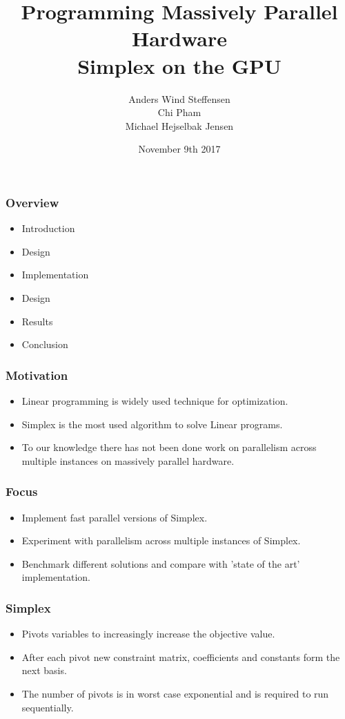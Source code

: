\documentclass{beamer}
\title{Programming Massively Parallel Hardware\\\textbf{Simplex on the GPU}}
\author[]{%
  Anders Wind Steffensen \\
  Chi Pham \\
  Michael Hejselbak Jensen \\
}
\institute{Department of Computer Science (DIKU)\\University of Copenhagen}
\date[3/3]{November 9th 2017}
\begin{document}
\titleslide


\begin{frame}
  \frametitle{Overview}
  \begin{itemize}
  \item Introduction
  \item Design
  \item Implementation
  \item Design
  \item Results
  \item Conclusion
  \end{itemize}
\end{frame}


\begin{frame}
\frametitle{Motivation}
\begin{itemize}
	\item Linear programming is widely used technique for optimization.
	\item Simplex is the most used algorithm to solve Linear programs.
	\item To our knowledge there has not been done work on parallelism across multiple instances on massively parallel hardware.
\end{itemize}
\end{frame}

\begin{frame}
\frametitle{Focus}
\begin{itemize}
\item Implement fast parallel versions of Simplex.
\item Experiment with parallelism across multiple instances of Simplex.
\item Benchmark different solutions and compare with 'state of the art' implementation.
\end{itemize}
\end{frame}


\begin{frame}
\frametitle{Simplex}
\begin{itemize}
\item Pivots variables to increasingly increase the objective value.
\item After each pivot new constraint matrix, coefficients and constants form the next basis.
\item The number of pivots is in worst case exponential and is required to run sequentially.
\end{itemize}
\end{frame}
\end{document}
